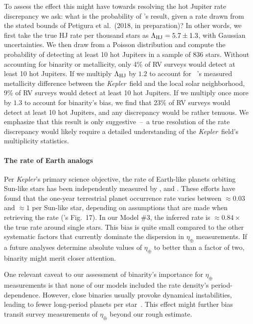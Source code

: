 \documentclass[12pt,modern]{aastex61}
\begin{document}
To assess the effect this might have towards resolving the hot Jupiter rate 
discrepancy we ask:
what is the probability of \citet{wright_frequency_2012}'s result, given a 
rate drawn from the stated bounds of Petigura et al.~(2018, in preparation)?
In other words, we first take the true HJ rate per thousand stars as 
$\Lambda_{\rm HJ} = 5.7 \pm 1.3$, with Gaussian uncertainties. 
We then draw from a Poisson distribution and compute the probability of 
detecting at least 10 hot Jupiters in a sample of 836 stars.
Without accounting for binarity or metallicity, only 4\% of RV surveys would 
detect at least 10 hot Jupiters.
If we multiply $\Lambda_{\rm HJ}$ by $1.2$ to account for 
~\citet{guo_metallicity_2017}'s measured metallicity difference between the 
{\it Kepler}\ field and the local solar neighborhood, 9\% of RV surveys would 
detect at least 10 hot Jupiters.
If we multiply once more by $1.3$ to account for binarity's bias, we find that
23\% of RV surveys would detect at least 10 hot Jupiters, and any discrepancy 
would be rather tenuous.
We emphasize that this result is only suggestive~--~a true resolution of the 
rate discrepancy would likely require a detailed understanding of the {\it 
    Kepler}\ field's multiplicity statistics.


\paragraph{The rate of Earth analogs}
Per {\it Kepler}'s primary science objective, the rate of Earth-like planets 
orbiting Sun-like stars has been independently measured by 
\citet{youdin_exoplanet_2011,petigura_prevalence_2013,dong_fast_2013,
    foreman-mackey_exoplanet_2014}, and \citet{burke_terrestrial_2015}.
These efforts have found that the one-year terrestrial planet occurrence rate 
varies between $\approx 0.03$ and $\approx 1$ per Sun-like star, depending on 
assumptions that are made when retrieving the rate 
(\citet{burke_terrestrial_2015}'s Fig.~17).
In our Model \#3, the inferred rate is $\approx 0.84\times$ the true rate 
around single stars.
This bias is quite small compared to the other systematic factors that 
currently dominate the dispersion in $\eta_\oplus$ measurements.
If a future analyses determine absolute values of $\eta_\oplus$ to 
better than a factor of two, binarity might merit closer attention.

One relevant caveat to our assessment of binarity's importance for 
$\eta_\oplus$ measurements is that none of our models 
included the rate density's period-dependence. However, close binaries usually
provoke dynamical instabilities, leading to fewer long-period planets per 
star~\citep[\textit{e.g.},][]{holman_long-term_1999,wang_influence_2014,
    kraus_impact_2016}.
This effect might further bias transit survey measurements of $\eta_\oplus$
beyond our rough estimate.
\end{document}
